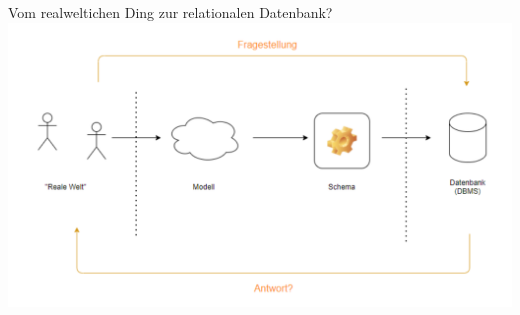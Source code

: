 \begin{frame}{Vom realweltichen Ding zur relationalen Datenbank?}
    \includegraphics[width=\textwidth]{img/von-welt-zu-db.png}
\end{frame}

